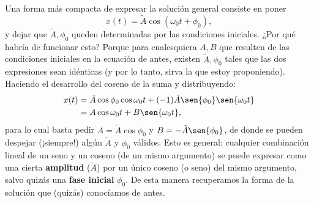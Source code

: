 \documentclass[a4paper,spanish]{article}
\numberwithin{equation}{section}
\begin{document}
Una forma m\'as compacta de expresar la soluci\'on general consiste en poner
		\[
			x(t) = \tilde{A}\cos{(\omega_0 t + \phi_0)},
		\]
y dejar que $\tilde{A}, \phi_0$ queden determinadas por las condiciones iniciales. ¿Por qu\'e habr\'ia de funcionar esto? Porque para cualesquiera $A,B$ que resulten de las condiciones iniciales en la ecuaci\'on de antes, existen $\tilde{A}, \phi_0$ tales que las dos expresiones sean id\'enticas (y por lo tanto, sirva la que estoy proponiendo). Haciendo el desarrollo del coseno de la suma y distribuyendo:
		\begin{align*}
			x(t) 	&= \tilde{A} \cos{\phi_0} \cos{\omega_0 t} + (-1)\tilde{A} \sen{\phi_0} \sen{\omega_0 t} \\
						&= A\cos{\omega_0 t} + B\sen{\omega_0 t},
		\end{align*}
para lo cual basta pedir $A=\tilde{A} \cos{\phi_0}$ y $B=-\tilde{A} \sen{\phi_0}$, de donde se pueden despejar (¡siempre!) alg\'un $\tilde{A}$ y $\phi_0$ v\'alidos. Esto es general: cualquier combinaci\'on lineal de un seno y un coseno (de un mismo argumento) se puede expresar como una cierta \textbf{amplitud} ($\tilde{A}$) por un \'unico coseno (o seno) del mismo argumento, salvo quiz\'as una \textbf{fase inicial} $\phi_0$. De esta manera recuperamos la forma de la soluci\'on que (quiz\'as) conoc\'iamos de antes.
\end{document}
